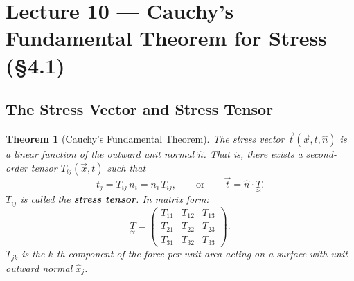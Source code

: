 \documentclass[11pt,a4paper]{article}
\newtheorem{theorem}{Theorem}[section]
\newcommand{\xv}{\vec{x}}
\newcommand{\nhat}{\hat{n}}
\newcommand{\tv}{\vec{t}}
\newcommand{\tens}[1]{\underset{\approx}{#1}}
\begin{document}
\maketitle
\tableofcontents
\newpage

\section{Lecture 10 --- Cauchy's Fundamental Theorem for Stress (\S4.1)}

\subsection{The Stress Vector and Stress Tensor}

\begin{theorem}[Cauchy's Fundamental Theorem]
The stress vector $\tv(\xv, t, \nhat)$ is a \emph{linear} function of the outward unit normal $\nhat$. That is, there exists a second-order tensor $T_{ij}(\xv,t)$ such that
\[
    t_j = T_{ij}\, n_i = n_i\,T_{ij}, \qquad \text{or} \qquad \tv = \nhat \cdot \tens{T}.
\]
$T_{ij}$ is called the \textbf{stress tensor}. In matrix form:
\[
    \tens{T} = \begin{pmatrix} T_{11} & T_{12} & T_{13} \\ T_{21} & T_{22} & T_{23} \\ T_{31} & T_{32} & T_{33} \end{pmatrix}.
\]
$T_{jk}$ is the $k$-th component of the force per unit area acting on a surface with unit outward normal $\hat{x}_j$.
\end{theorem}
\end{document}
